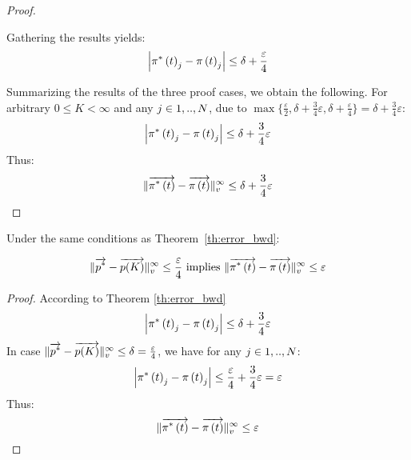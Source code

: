 \documentclass{entcs}
\begin{document}
{\begin{proof}
\begin{enumerate}
						Gathering the results yields:
						\begin{equation}	
								\left| \pi^{*} \left( t \right)_{j} - \pi \left( t \right)_{j} \right| \leq \delta + \frac{\varepsilon}{4} \nonumber
						\end{equation}
				\end{enumerate}
				Summarizing the results of the three proof cases, we obtain the following.
				For arbitrary $ 0 \leq K < \infty$ and any $j \in 1,..,N$, due to $\max\{ \frac{\varepsilon}{2}, \delta + \frac{3}{4} \varepsilon, \delta + \frac{\varepsilon}{4} \} = \delta + \frac{3}{4} \varepsilon$:
				\begin{equation}
					\left| \pi^{*} \left( t \right)_{j} - \pi \left( t \right)_{j} \right| \leq \delta + \frac{3}{4} \varepsilon \nonumber
				\end{equation}
				Thus:
				\begin{equation}
					\lVert   \overrightarrow{\pi^{*} \left( t \right)} - \overrightarrow{\pi \left( t \right) }   \rVert_{v}^{\infty} \leq \delta + \frac{3}{4} \varepsilon \nonumber
				\end{equation}
			\end{proof}
		}

		\begin{corollary}
			Under the same conditions as Theorem~\ref{th:error_bwd}:
			\begin{fframe}{0.7}{-0.2}
				\begin{equation}
					\lVert  \overrightarrow{p^{*}} - \overrightarrow{p(K)}  \rVert_{v}^{\infty} \leq \frac{\varepsilon}{4} \text{ implies } \lVert  \overrightarrow{\pi^{*} \left( t \right)} - \overrightarrow{\pi \left( t \right) }  \rVert_{v}^{\infty}\leq \varepsilon \nonumber
				\end{equation}
			\end{fframe}
		 \end{corollary}
		{\small
			\begin{proof}
				According to Theorem \ref{th:error_bwd} 
				\begin{equation}
					\left| \pi^{*} \left( t \right)_{j} - \pi \left( t \right)_{j} \right| \leq \delta + \frac{3}{4} \varepsilon \nonumber
				\end{equation}
				In case $\lVert  \overrightarrow{p^{*}} - \overrightarrow{p(K)}  \rVert_{v}^{\infty} \leq \delta = \frac{\varepsilon}{4}$, we have for any $j \in 1,..,N$:
				\begin{equation}
					\left| \pi^{*} \left( t \right)_{j} - \pi \left( t \right)_{j} \right| \leq \frac{\varepsilon}{4}  + \frac{3}{4} \varepsilon = \varepsilon \nonumber
				\end{equation}
				Thus:
				\begin{equation}
					\lVert  \overrightarrow{\pi^{*} \left( t \right)} - \overrightarrow{\pi \left( t \right) }  \rVert_{v}^{\infty} \leq \varepsilon \nonumber
				\end{equation}
			\end{proof}
		}
\end{document}
